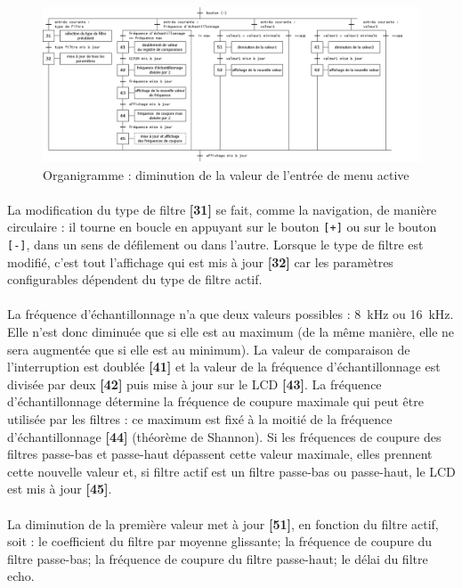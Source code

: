 \documentclass{article}
\begin{document}
    \begin{figure}[H]
        \centering
        \includegraphics[width=\textwidth]{./images/orga_decrease.png}
        \caption{Organigramme : diminution de la valeur de l'entrée de menu active}
    \end{figure}

    \paragraph{}
    La modification du type de filtre \textbf{[31]} se fait, comme la navigation, de manière circulaire : il tourne en boucle en appuyant sur le bouton \texttt{[+]} ou sur le bouton \texttt{[-]}, dans un sens de défilement ou dans l'autre. Lorsque le type de filtre est modifié, c'est tout l'affichage qui est mis à jour \textbf{[32]} car les paramètres configurables dépendent du type de filtre actif.

    \paragraph{}
    La fréquence d'échantillonnage n'a que deux valeurs possibles : \SI{8}{\kilo\hertz} ou \SI{16}{\kilo\hertz}. Elle n'est donc diminuée que si elle est au maximum (de la même manière, elle ne sera augmentée que si elle est au minimum). La valeur de comparaison de l'interruption est doublée \textbf{[41]} et la valeur de la fréquence d'échantillonnage est divisée par deux \textbf{[42]} puis mise à jour sur le LCD \textbf{[43]}. La fréquence d'échantillonnage détermine la fréquence de coupure maximale qui peut être utilisée par les filtres : ce maximum est fixé à la moitié de la fréquence d'échantillonnage \textbf{[44]} (théorème de Shannon). Si les fréquences de coupure des filtres passe-bas et passe-haut dépassent cette valeur maximale, elles prennent cette nouvelle valeur et, si filtre actif est un filtre passe-bas ou passe-haut, le LCD est mis à jour \textbf{[45]}.

    \paragraph{}
    La diminution de la première valeur met à jour \textbf{[51]}, en fonction du filtre actif, soit : le coefficient du filtre par moyenne glissante; la fréquence de coupure du filtre passe-bas; la fréquence de coupure du filtre passe-haut; le délai du filtre echo.
\end{document}
